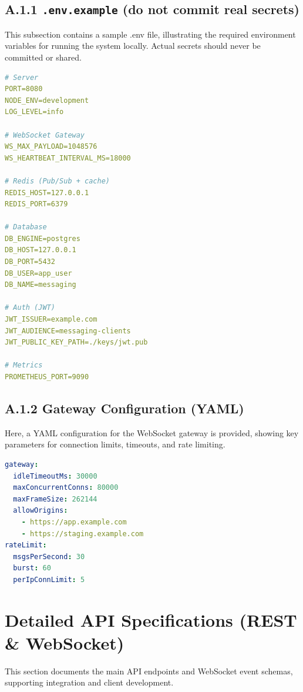 \subsection*{A.1.1 \texttt{.env.example} (do not commit real secrets)}
This subsection contains a sample .env file, illustrating the required environment variables for running the system locally. Actual secrets should never be committed or shared.
\begin{lstlisting}[language=yaml, caption={Sample .env.example for local development (no secrets)}]
# Server
PORT=8080
NODE_ENV=development
LOG_LEVEL=info

# WebSocket Gateway
WS_MAX_PAYLOAD=1048576
WS_HEARTBEAT_INTERVAL_MS=18000

# Redis (Pub/Sub + cache)
REDIS_HOST=127.0.0.1
REDIS_PORT=6379

# Database
DB_ENGINE=postgres
DB_HOST=127.0.0.1
DB_PORT=5432
DB_USER=app_user
DB_NAME=messaging

# Auth (JWT)
JWT_ISSUER=example.com
JWT_AUDIENCE=messaging-clients
JWT_PUBLIC_KEY_PATH=./keys/jwt.pub

# Metrics
PROMETHEUS_PORT=9090
\end{lstlisting}

\subsection*{A.1.2 Gateway Configuration (YAML)}
Here, a YAML configuration for the WebSocket gateway is provided, showing key parameters for connection limits, timeouts, and rate limiting.
\begin{lstlisting}[language=yaml, caption={WebSocket gateway configuration (sample)}]
gateway:
  idleTimeoutMs: 30000
  maxConcurrentConns: 80000
  maxFrameSize: 262144
  allowOrigins:
    - https://app.example.com
    - https://staging.example.com
rateLimit:
  msgsPerSecond: 30
  burst: 60
  perIpConnLimit: 5
\end{lstlisting}



\section{Detailed API Specifications (REST \& WebSocket)}
This section documents the main API endpoints and WebSocket event schemas, supporting integration and client development.
\label{app:apispec}

